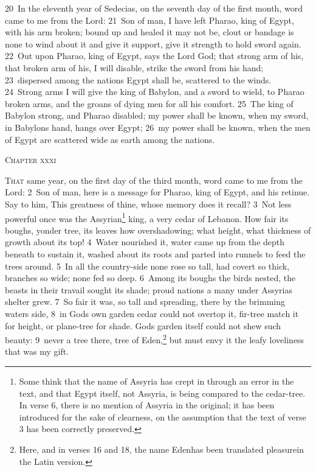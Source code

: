 \documentclass[10pt]{book} %
\begin{document}
\textcolor{benred8}{20}~In the eleventh year of Sedecias, on the seventh day of the first month, word came to me from the Lord: \textcolor{benred8}{21}~Son of man, I have left Pharao, king of Egypt, with his arm broken; bound up and healed it may not be, clout or bandage is none to wind about it and give it support, give it strength to hold sword again. \textcolor{benred8}{22}~Out upon Pharao, king of Egypt, says the Lord God; that strong arm of his, that broken arm of his, I will disable, strike the sword from his hand; \textcolor{benred8}{23}~dispersed among the nations Egypt shall be, scattered to the winds. \textcolor{benred8}{24}~Strong arms I will give the king of Babylon, and a sword to wield, to Pharao broken arms, and the groans of dying men for all his comfort. \textcolor{benred8}{25}~The king of Babylon strong, and Pharao disabled; my power shall be known, when my sword, in Babylon\textquotesingle s hand, hangs over Egypt; \textcolor{benred8}{26}~my power shall be known, when the men of Egypt are scattered wide as earth among the nations.
\begin{large}\begin{center}\textsc{Chapter xxxi}\end{center}\end{large}
\lettrine[lines=2]{T}{hat} same year, on the first day of the third month, word came to me from the Lord: \textcolor{benred8}{2}~Son of man, here is a message for Pharao, king of Egypt, and his retinue. Say to him, This greatness of thine, whose memory does it recall? \textcolor{benred8}{3}~Not less powerful once was the Assyrian\footnote[1]{Some think that the name of Assyria has crept in through an error in the text, and that Egypt itself, not Assyria, is being compared to the cedar-tree. In verse 6, there is no mention of Assyria in the original; it has been introduced for the sake of clearness, on the assumption that the text of verse 3 has been correctly preserved.} king, a very cedar of Lebanon. How fair its boughs, yonder tree, its leaves how overshadowing; what height, what thickness of growth about its top! \textcolor{benred8}{4}~Water nourished it, water came up from the depth beneath to sustain it, washed about its roots and parted into runnels to feed the trees around. \textcolor{benred8}{5}~In all the country-side none rose so tall, had covert so thick, branches so wide; none fed so deep. \textcolor{benred8}{6}~Among its boughs the birds nested, the beasts in their travail sought its shade; proud nations a many under Assyria\textquotesingle s shelter grew. \textcolor{benred8}{7}~So fair it was, so tall and spreading, there by the brimming water\textquotesingle s side, \textcolor{benred8}{8}~in God\textquotesingle s own garden cedar could not overtop it, fir-tree match it for height, or plane-tree for shade. God\textquotesingle s garden itself could not shew such beauty: \textcolor{benred8}{9}~never a tree there, tree of Eden,\footnote[2]{Here, and in verses 16 and 18, the name \textasciigrave Eden\textquotesingle  has been translated \textasciigrave pleasure\textquotesingle  in the Latin version.} but must envy it the leafy loveliness that was my gift.
\end{document}
